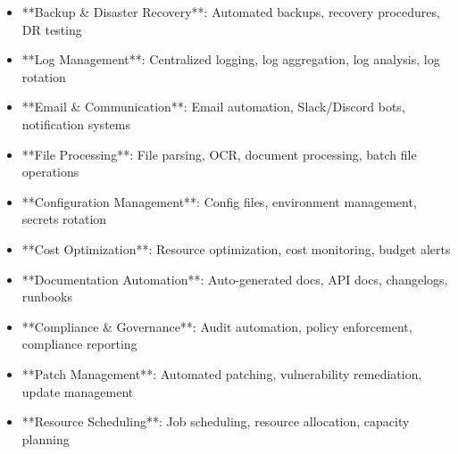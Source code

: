 \documentclass[11pt,a4paper]{article}
\begin{document}
\begin{itemize}
\item **Backup & Disaster Recovery**: Automated backups, recovery procedures, DR testing
\end{itemize}

\begin{itemize}
\item **Log Management**: Centralized logging, log aggregation, log analysis, log rotation
\end{itemize}

\begin{itemize}
\item **Email & Communication**: Email automation, Slack/Discord bots, notification systems
\end{itemize}

\begin{itemize}
\item **File Processing**: File parsing, OCR, document processing, batch file operations
\end{itemize}

\begin{itemize}
\item **Configuration Management**: Config files, environment management, secrets rotation
\end{itemize}

\begin{itemize}
\item **Cost Optimization**: Resource optimization, cost monitoring, budget alerts
\end{itemize}

\begin{itemize}
\item **Documentation Automation**: Auto-generated docs, API docs, changelogs, runbooks
\end{itemize}

\begin{itemize}
\item **Compliance & Governance**: Audit automation, policy enforcement, compliance reporting
\end{itemize}

\begin{itemize}
\item **Patch Management**: Automated patching, vulnerability remediation, update management
\end{itemize}

\begin{itemize}
\item **Resource Scheduling**: Job scheduling, resource allocation, capacity planning
\end{itemize}
\end{document}
